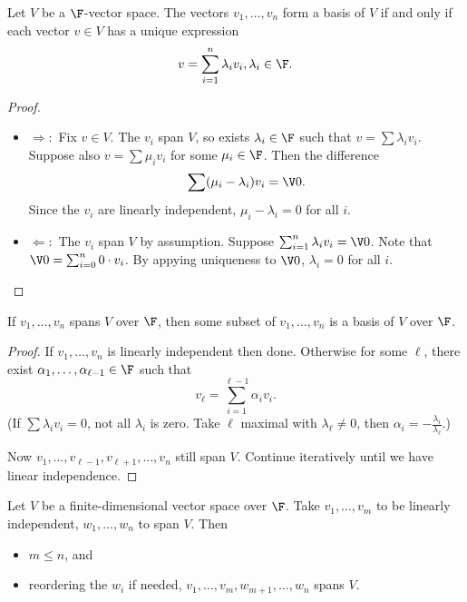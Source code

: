\documentclass[a4paper]{article}
\theoremstyle{definition}
\begin{document}
\begin{lemma}
  Let $V$ be a $\F$-vector space. The vectors $v_1,\ldots,v_n$ form a basis of $V$ if and only if each vector $v\in V$ has a unique expression
  \[
    v = \sum_{i=1}^n \lambda_i v_i, \lambda_i \in \F.
  \]
  
\end{lemma}

\begin{proof}\leavevmode
  \begin{itemize}
  \item $\Rightarrow:$ Fix $v\in V$. The $v_i$ span $V$, so exists $\lambda_i \in \F$ such that $v = \sum \lambda_i v_i$. Suppose also $v = \sum \mu_i v_i$ for some $\mu_i \in \F$. Then the difference
  \[
    \sum (\mu_i - \lambda_i) v_i = \V 0.
  \]
  Since the $v_i$ are linearly independent, $\mu_i-\lambda_i = 0$ for all $i$.
\item $\Leftarrow:$ The $v_i$ span $V$ by assumption. Suppose $\sum_{i=1}^n \lambda_i v_i = \V 0$. Note that $\V 0 = \sum_{i=0}^n 0 \cdot v_i$. By appying uniqueness to $\V 0$, $\lambda_i = 0$ for all $i$.
  \end{itemize}
\end{proof}

\begin{lemma}
  If $v_1,\ldots, v_n$ spans $V$ over $\F$, then some subset of $v_1,\ldots,v_n$ is a basis of $V$ over $\F$.
\end{lemma}

\begin{proof}
  If $v_1,\ldots, v_n$ is linearly independent then done. Otherwise for some $\ell$, there exist $\alpha_1, \ldots, \alpha_{\ell-1} \in \F$ such that
  \[
    v_\ell = \sum_{i=1}^{\ell-1} \alpha_i v_i.
  \]
  (If $\sum \lambda_i v_i = 0$, not all $\lambda_i$ is zero. Take $\ell$ maximal with $\lambda_\ell \neq 0$, then $\alpha_i = -\frac{\lambda_i}{\lambda_\ell}$.)

  Now $v_1,\ldots,v_{\ell-1},v_{\ell+1},\ldots,v_n$ still span $V$. Continue iteratively until we have linear independence.
\end{proof}

\begin{theorem}
  Let $V$ be a finite-dimensional vector space over $\F$. Take $v_1,\ldots,v_m$ to be linearly independent, $w_1,\ldots,w_n$ to span $V$. Then
  \begin{itemize}
  \item $m \leq n$, and
    \item reordering the $w_i$ if needed, $v_1,\ldots, v_m, w_{m+1},\ldots,w_n$ spans $V$.
  \end{itemize}
\end{theorem}
\end{document}
